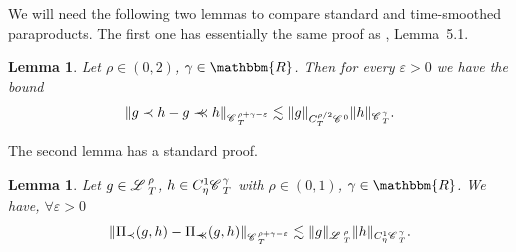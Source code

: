 \documentclass[11pt,reqno]{amsart}
\newcommand{\precprec}{\prec\!\!\!\prec}
\newtheorem{lemma}[theorem]{Lemma}
\newcommand{\CC}{\mathscr{C} \hspace{.1em}}
\newcommand{\LL}{\mathscr{L} \hspace{.2em}}
\begin{document}
We will need the following two lemmas to compare standard and time-smoothed
paraproducts. The first one has essentially the same proof as
{\cite{gubinelli_paracontrolled_2015}}, Lemma~5.1.

\begin{lemma}
  \label{l:comm-paraproduct} Let $\rho \in (0, 2)$, $\gamma \in \mathbbm{R}$.
  Then for every $\varepsilon > 0$ we have the bound
  \[ \| g \prec h - g \precprec h \|_{\CC^{\rho + \gamma - \varepsilon}_T}
     \lesssim \| g \|_{C_T^{\rho / 2} \CC^0} \| h \|_{\CC^{\gamma}_T} . \]
\end{lemma}

The second lemma has a standard proof.

\begin{lemma}
  \label{l:comm-nonlin-para}Let $g \in \LL^{\rho}_T$, $h \in C_{\eta}^1
  \CC^{\gamma}_T$ with $\rho \in (0, 1)$, $\gamma \in \mathbbm{R}$. We have,
  $\forall \varepsilon > 0$
  \[ \| \Pi_{\prec} (g, h) - \Pi_{\precprec} (g, h) \|_{\CC^{\rho + \gamma -
     \varepsilon}_T} \lesssim \| g \|_{\LL^{\rho}_T} \| h \|_{C_{\eta}^1
     \CC^{\gamma}_T} . \]
\end{lemma}
\end{document}

